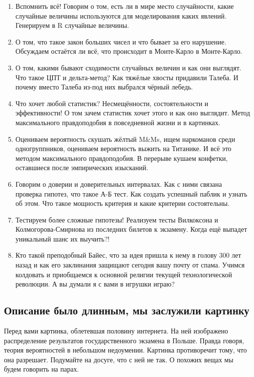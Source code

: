 \documentclass[12pt, a4paper, oneside]{article}
\begin{document}
\begin{enumerate}
\item Вспомнить всё! Говорим о том, есть ли в мире место случайности, какие случайные величины используются для моделирования каких явлений. Генерируем в R случайные величины. 
\item  О том, что такое закон больших чисел и что бывает за его нарушение. Обсуждаем остаётся ли всё, что происходит в Монте-Карло в Монте-Карло.
\item  О том, какими бывают сходимости случайных величин и как они выглядят. Что такое ЦПТ и дельта-метод? Как тяжёлые хвосты придавили Талеба. И почему вместо Талеба из-под них выбрался чёрный лебедь.
\item  Что хочет любой статистик? Несмещённости, состоятельности и эффективности! О том зачем статистик хочет этого и как оно выглядит. Метод максимального правдоподобия в повседневной жизни и в картинках.
\item Оцениваем вероятность скушать жёлтый M\&Ms, ищем наркоманов среди одногруппников, оцениваем вероятность выжить на Титанике. И всё это методом максимального правдоподобия. В перерыве кушаем конфетки, оставшиеся после эмпирических изысканий. 
\item Говорим о доверии и доверительных интервалах. Как с ними связана проверка гипотез, что такое А-Б тест. Как создать успешный паблик и узнать об этом. Что такое мощность критерия и какие критерии состоятельны. 
\item Тестируем более сложные гипотезы! Реализуем тесты Вилкоксона и Колмогорова-Смирнова из последних билетов к экзамену. Когда ещё выпадет уникальный шанс их выучить?! 
\item Кто такой преподобный Байес, что за идея пришла к нему в голову 300 лет назад и как его заклинания защищают сегодня вашу почту от спама. Учимся колдовать и приобщаемся к основной религии текущей технологической революции. А вы думали я с вами в игрушки играю? 
\end{enumerate}

\subsection*{Описание было длинным, мы заслужили картинку}

Перед вами картинка, облетевшая половину интернета. На ней изображено распределение результатов государственного экзамена в Польше. Правда говоря, теория вероятностей в небольшом недоумении. Картинка противоречит тому, что она разрешает. Подумайте на досуге, что с ней не так. О похожих вещах мы будем говорить на парах. 
\end{document}

